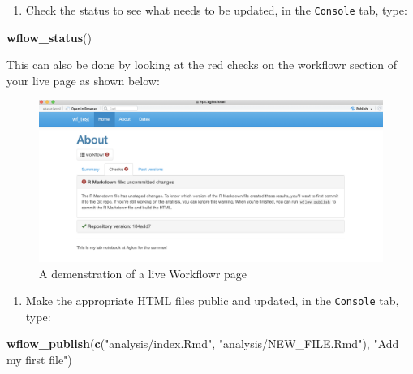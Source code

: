 \documentclass[openany]{article}
\newenvironment{Shaded}{\begin{snugshade}}{\end{snugshade}}
\newcommand{\KeywordTok}[1]{\textcolor[rgb]{0.13,0.29,0.53}{\textbf{#1}}}
\newcommand{\NormalTok}[1]{#1}
\newcommand{\StringTok}[1]{\textcolor[rgb]{0.31,0.60,0.02}{#1}}
\providecommand{\tightlist}{%
  \setlength{\itemsep}{0pt}\setlength{\parskip}{0pt}}
\begin{document}
\begin{enumerate}
\def\labelenumi{\arabic{enumi}.}
\tightlist
\item
  Check the status to see what needs to be updated, in the \texttt{Console} tab, type:
\end{enumerate}

\begin{Shaded}
\begin{Highlighting}[]
\KeywordTok{wflow_status}\NormalTok{()}
\end{Highlighting}
\end{Shaded}

This can also be done by looking at the red checks on the workflowr section of your live page as shown below:

\begin{figure}

{\centering \includegraphics[width=0.9\linewidth]{images/Workflow_Photos/red_checks} 

}

\caption{A demenstration of a live Workflowr page}\label{fig:d4}
\end{figure}

\begin{enumerate}
\def\labelenumi{\arabic{enumi}.}
\setcounter{enumi}{1}
\tightlist
\item
  Make the appropriate HTML files public and updated, in the \texttt{Console} tab, type:
\end{enumerate}

\begin{Shaded}
\begin{Highlighting}[]
\KeywordTok{wflow_publish}\NormalTok{(}\KeywordTok{c}\NormalTok{(}\StringTok{"analysis/index.Rmd"}\NormalTok{, }\StringTok{"analysis/NEW_FILE.Rmd"}\NormalTok{), }\StringTok{"Add my first file"}\NormalTok{)}
\end{Highlighting}
\end{Shaded}
\end{document}
